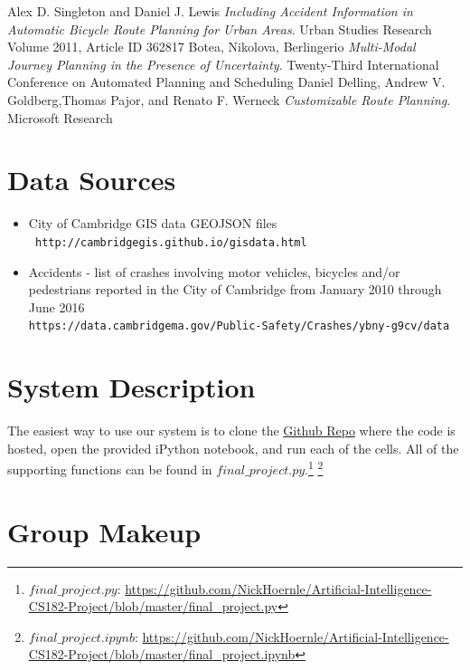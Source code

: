 \documentclass[11pt]{article}
\begin{document}
\begin{thebibliography}{9}
Alex D. Singleton and Daniel J. Lewis
\textit{Including Accident Information in Automatic Bicycle Route Planning for Urban Areas}. 
Urban Studies Research Volume 2011, Article ID 362817
Botea, Nikolova, Berlingerio
\textit{Multi-Modal Journey Planning in the Presence of Uncertainty}. 
Twenty-Third International Conference on Automated Planning and Scheduling
Daniel Delling, Andrew V. Goldberg,Thomas Pajor, and Renato F. Werneck
\textit{Customizable Route Planning}. 
Microsoft Research
\end{thebibliography}

\section*{Data Sources}
\begin{itemize}
\item City of Cambridge GIS data GEOJSON files \\
\texttt{ http://cambridgegis.github.io/gisdata.html}
\item Accidents - list of crashes involving motor vehicles, bicycles and/or pedestrians reported in the City of Cambridge from January 2010 through June 2016 \\
\texttt {https://data.cambridgema.gov/Public-Safety/Crashes/ybny-g9cv/data} \\
\end{itemize}


\newpage
\appendix
\section{System Description}

The easiest way to use our system is to clone the \href{https://github.com/NickHoernle/Artificial-Intelligence-CS182-Project/blob/master/}{Github Repo} where the code is hosted, open the provided iPython notebook, and run each of the cells. All of the supporting functions can be found in $final\_project.py$.\footnote{$final\_project.py$: \url{https://github.com/NickHoernle/Artificial-Intelligence-CS182-Project/blob/master/final_project.py}} \footnote{$final\_project.ipynb$: \url{https://github.com/NickHoernle/Artificial-Intelligence-CS182-Project/blob/master/final_project.ipynb}}

\section{Group Makeup}
\end{document}
